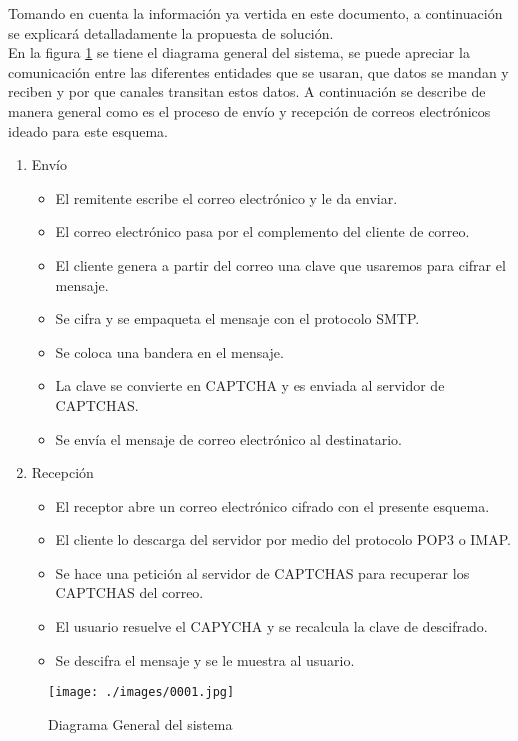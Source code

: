 \documentclass[12pt,oneside,onecolumn,openany]{report}
\begin{document}
Tomando en cuenta la información ya vertida en este documento, a continuación se explicará detalladamente la propuesta de solución.\\
En la figura \ref{fig:4-1-1} se tiene el diagrama general del sistema, se puede apreciar la comunicación entre las diferentes entidades que se usaran, que datos se mandan y reciben y por que canales transitan estos datos. A continuación se describe de manera general como es el proceso de envío y recepción de correos electrónicos ideado para este esquema.\\
\begin{enumerate}
 \item {Envío}
\begin{itemize}
\item El remitente escribe el correo electrónico y le da enviar.\\
\item El correo electrónico pasa por el complemento del cliente de correo.\\
\item El cliente genera a partir del correo una clave que usaremos para cifrar el mensaje.\\
\item Se cifra y se empaqueta el mensaje con el protocolo SMTP.\\
\item Se coloca una bandera en el mensaje.\\
\item La clave se convierte en CAPTCHA y es enviada al servidor de CAPTCHAS.\\
\item Se envía el mensaje de correo electrónico al destinatario.\\
\end{itemize}

\item{Recepción}
\begin{itemize}
\item El receptor abre un correo electrónico cifrado con el presente esquema.\\
\item El cliente lo descarga del servidor por medio del protocolo POP3 o IMAP.\\
\item Se hace una petición al servidor de CAPTCHAS para recuperar los CAPTCHAS del correo.\\
\item El usuario resuelve el CAPYCHA y se recalcula la clave de descifrado.\\
\item Se descifra el mensaje y se le muestra al usuario.\\
\end{itemize}
\end{enumerate}
\begin{figure}[h]
	\texttt{[image: ./images/0001.jpg]}
	\caption{Diagrama General del sistema}
	\label{fig:4-1-1}
\end{figure}
\end{document}

